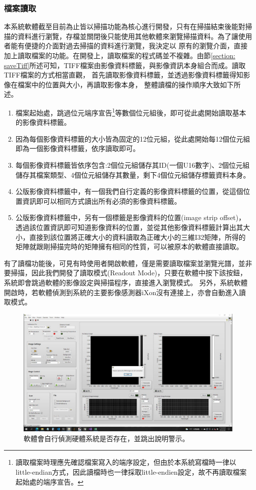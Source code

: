 \documentclass[12pt]{article}
\begin{document}
\subsubsection{檔案讀取}
本系統軟體截至目前為止皆以掃描功能為核心進行開發，只有在掃描結束後能對掃描的資料進行瀏覽，存檔並關閉後只能使用其他軟體來瀏覽掃描資料。為了讓使用者能有便捷的介面對過去掃描的資料進行瀏覽，我決定以
原有的瀏覽介面，直接加上讀取檔案的功能。在開發上，讀取檔案的程式碼並不複雜。由節\ref{section: saveTiff}所述可知，TIFF檔案由影像資料標籤，與影像資訊本身組合而成。讀取TIFF檔案的方式相當直觀，
首先讀取影像資料標籤，並透過影像資料標籤得知影像在檔案中的位置與大小，再讀取影像本身，
整體讀檔的操作順序大致如下所述。
\begin{enumerate}
    \item 檔案起始處，跳過位元端序宣告\footnote{讀取檔案時理應先確認檔案寫入的端序設定，但由於本系統寫檔時一律以little-endian方式，因此讀檔時也一律採取little-endien設定，故不再讀取檔案起始處的端序宣告。}等數個位元組後，即可從此處開始讀取基本的影像資料標籤。
    \item 因為每個影像資料標籤的大小皆為固定的12位元組，從此處開始每12個位元組即為一個影像資料標籤，依序讀取即可。
    \item 每個影像資料標籤皆依序包含:2個位元組儲存其ID(一個U16數字)、2個位元組儲存其檔案類型、4個位元組儲存其數量，剩下4個位元組儲存標籤資料本身。
    \item 公版影像資料標籤中，有一個我們自行定義的影像資料標籤的位置，從這個位置資訊即可以相同方式讀出所有必須的影像資料標籤。
    \item 公版影像資料標籤中，另有一個標籤是影像資料的位置(image strip offset)，透過該位置資訊即可知道影像資料的位置，並從其他影像資料標籤計算出其大小，直接到該位置將正確大小的資料讀取為正確大小的三維I32矩陣，所得的矩陣就跟剛掃描完時的矩陣擁有相同的性質，可以被原本的軟體直接讀取。
\end{enumerate}

有了讀檔功能後，可見有時使用者開啟軟體，僅是需要讀取檔案並瀏覽光譜，並非要掃描，因此我們開發了讀取模式(Readout Mode)，只要在軟體中按下該按鈕，系統即會跳過軟體的影像設定與掃描程序，直接進入瀏覽模式。
另外，系統軟體開啟時，若軟體偵測到系統的主要影像感測器iXon沒有連接上，亦會自動進入讀取模式。
\begin{figure}[ht]
    \centering
    \includegraphics[width=\linewidth]{detectHW.jpeg}
    \caption{軟體會自行偵測硬體系統是否存在，並跳出說明警示。}
    \label{figure: detect hardware}
\end{figure}
\end{document}
